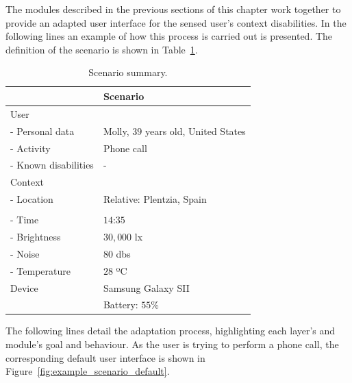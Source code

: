 The modules described in the previous sections of this chapter work together to
provide an adapted user interface for the sensed user's context disabilities. 
In the following lines an example of how this process is carried out is 
presented. The definition of the scenario is shown in Table~\ref{tbl:example_scenario}.

\begin{table}[H]
 \caption{Scenario summary.}
 \label{tbl:example_scenario}
 \footnotesize
 \centering
\begin{tabular}{l l}
  \hline 
				& \textbf{Scenario}		\\
  \hline
  User \\
  \qquad - Personal data 	& Molly, $39$ years old, United States\\
  \qquad - Activity	 	& Phone call			\\
  \qquad - Known disabilities 	& - 				\\
  Context \\
  \qquad - Location 		& Relative: Plentzia, Spain  	\\
				& 				\\
  \qquad - Time			& $14$:$35$ 			\\
  \qquad - Brightness		& $30,000$ \ac{lx}		\\
  \qquad - Noise		& $80$ \acp{db}			\\
  \qquad - Temperature		& $28$ ºC 			\\
  Device 			& Samsung Galaxy SII 	 	\\
				& Battery: $55$\%			\\
  \hline
\end{tabular}
\end{table}

The following lines detail the adaptation process, highlighting each layer's and
module's goal and behaviour. As the user is trying to perform a phone call, the 
corresponding default user interface is shown in Figure~\ref{fig:example_scenario_default}.

